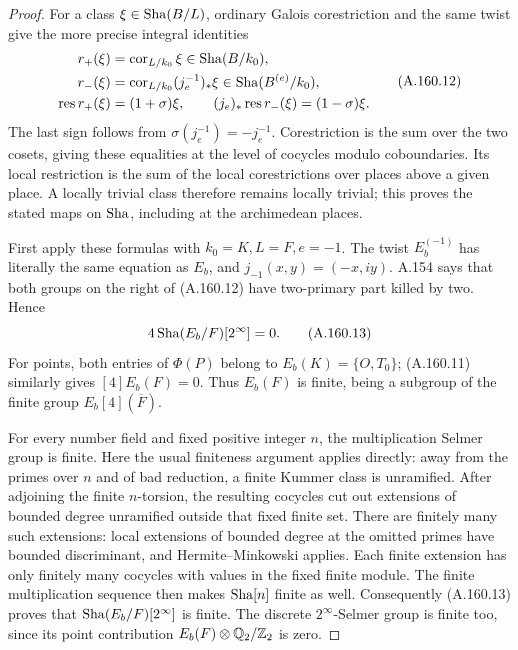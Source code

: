 \begin{proof}
For a class \(\xi\in\operatorname{Sha}(B/L)\), ordinary Galois
corestriction and the same twist give the more precise
integral identities
\[
 \begin{aligned}
 r_+(\xi)&=\operatorname{cor}_{L/k_0}\xi
                                      \in\operatorname{Sha}(B/k_0),\\
 r_-(\xi)&=\operatorname{cor}_{L/k_0}(j_e^{-1})_*\xi
                                      \in\operatorname{Sha}(B^{(e)}/k_0),\\
 \operatorname{res}r_+(\xi)&=(1+\sigma)\xi,\qquad
 (j_e)_*\operatorname{res}r_-(\xi)=(1-\sigma)\xi.
 \end{aligned}
\tag{A.160.12}
\]
The last sign follows from \(\sigma(j_e^{-1})=-j_e^{-1}\).
Corestriction is the sum over the two cosets, giving these
equalities at the level of cocycles modulo coboundaries.
Its local restriction is the sum of the local
corestrictions over places above a given place.  A locally
trivial class therefore remains locally trivial; this
proves the stated maps on \(\operatorname{Sha}\), including at the
archimedean places.

First apply these formulas with \(k_0=K,L=F,e=-1\).
The twist \(E_b^{(-1)}\) has literally the same equation
as \(E_b\), and \(j_{-1}(x,y)=(-x,iy)\).
A.154 says that both groups on the right of (A.160.12)
have two-primary part killed by two.  Hence
\[
             4\operatorname{Sha}(E_b/F)[2^\infty]=0.
\tag{A.160.13}
\]
For points, both entries of \(\Phi(P)\) belong to
\(E_b(K)=\{O,T_0\}\); (A.160.11) similarly gives
\([4]E_b(F)=0\).  Thus \(E_b(F)\) is finite, being a
subgroup of the finite group \(E_b[4](\overline F)\).

For every number field and fixed positive integer \(n\),
the multiplication Selmer group is finite.  Here the usual
finiteness argument applies directly: away from the primes
over \(n\) and of bad reduction, a finite Kummer class is
unramified.  After adjoining the finite \(n\)-torsion,
the resulting cocycles cut out extensions of bounded degree
unramified outside that fixed finite set.  There are
finitely many such extensions: local extensions of bounded
degree at the omitted primes have bounded discriminant,
and Hermite--Minkowski applies.  Each finite extension has
only finitely many cocycles with values in the fixed finite
module.  The finite multiplication sequence then makes
\(\operatorname{Sha}[n]\) finite as well.  Consequently (A.160.13)
proves that \(\operatorname{Sha}(E_b/F)[2^\infty]\) is finite.
The discrete \(2^\infty\)-Selmer group is finite too,
since its point contribution \(E_b(F)\otimes\mathbb Q_2/\mathbb Z_2\)
is zero.


\end{proof}
